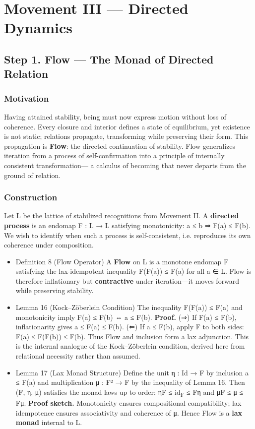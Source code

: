 \documentclass[11pt]{article}
\begin{document}
\section*{Movement III — Directed Dynamics}
\label{sec:org4f75207}
\subsection*{Step 1. Flow — The Monad of Directed Relation}
\label{sec:org1a4ac4f}

\subsubsection*{Motivation}
\label{sec:org42ed90d}
Having attained stability, being must now express motion without loss of coherence.  
Every closure and interior defines a state of equilibrium, yet existence is not static;  
relations propagate, transforming while preserving their form.  
This propagation is \textbf{Flow}: the directed continuation of stability.  
Flow generalizes iteration from a process of self-confirmation into a principle of internally consistent transformation—  
a calculus of becoming that never departs from the ground of relation.
\subsubsection*{Construction}
\label{sec:org05b9c20}
Let L be the lattice of stabilized recognitions from Movement II.  
A \textbf{directed process} is an endomap F : L → L satisfying monotonicity: a ≤ b ⇒ F(a) ≤ F(b).  
We wish to identify when such a process is self-consistent, i.e. reproduces its own coherence under composition.
\begin{itemize}
\item Definition 8 (Flow Operator)
\label{sec:org2ad45e4}
A \textbf{Flow} on L is a monotone endomap F satisfying the lax-idempotent inequality  
F(F(a)) ≤ F(a)  for all a ∈ L.  
Flow is therefore inflationary but \textbf{contractive} under iteration—it moves forward while preserving stability.
\item Lemma 16 (Kock–Zöberlein Condition)
\label{sec:org16b2142}
The inequality F(F(a)) ≤ F(a) and monotonicity imply  
F(a) ≤ F(b) ⇔ a ≤ F(b).  
\textbf{Proof.}  
(⇒) If F(a) ≤ F(b), inflationarity gives a ≤ F(a) ≤ F(b).  
(⇐) If a ≤ F(b), apply F to both sides: F(a) ≤ F(F(b)) ≤ F(b).  
Thus Flow and inclusion form a lax adjunction.  
This is the internal analogue of the Kock–Zöberlein condition, derived here from relational necessity rather than assumed.
\item Lemma 17 (Lax Monad Structure)
\label{sec:org0383b1c}
Define the unit η : Id → F by inclusion a ≤ F(a) and multiplication μ : F² → F by the inequality of Lemma 16.  
Then (F, η, μ) satisfies the monad laws up to order:  
ηF ≤ id\textsubscript{F} ≤ Fη and μF ≤ μ ≤ Fμ.  
\textbf{Proof sketch.}  Monotonicity ensures compositional compatibility;  
lax idempotence ensures associativity and coherence of μ.  
Hence Flow is a \textbf{lax monad} internal to L.
\end{itemize}
\end{document}
